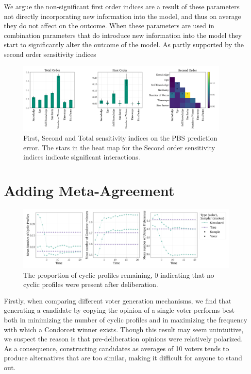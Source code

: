 We argue the non-significant first order indices are a result of these
parameters not directly incorporating new information into the model, and thus
on average they do not affect on the outcome. When these parameters are used in
combination parameters that do introduce new information into the model they
start to significantly alter the outcome of the model. As partly supported by
the second order sensitivity indices

\begin{figure}[ht]
	\begin{center}
		\includegraphics[width=0.95\textwidth]{Figures/senstivity_analysis.png}
	\end{center}
	\caption{First, Second and Total sensitivity indices on the PBS prediction error. The stars in the heat map for the Second order sensitivity indices indicate significant interactions. }\label{fig:sensitivty_pbs}
\end{figure}


\section{Adding Meta-Agreement}

\begin{figure}[htbp]
	\centering
	\centering
	\includegraphics[width=\textwidth]{Figures/three_measures.png
	}
	\caption{The proportion of cyclic profiles remaining, 0 indicating that no cyclic profiles were present after deliberation.}
	\label{fig:degroot_cyclic}
\end{figure}

Firstly, when comparing different voter generation mechanisms, we find that generating a candidate by copying the opinion of a single voter performs best—both in minimizing the number of cyclic profiles and in maximizing the frequency with which a Condorcet winner exists. Though this result may seem unintuitive, we suspect the reason is that pre-deliberation opinions were relatively polarized. As a consequence, constructing candidates as averages of 10 voters tends to produce alternatives that are too similar, making it difficult for anyone to stand out.

